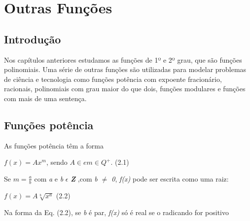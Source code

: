 \chapter{Outras Funções}
\section{Introdução}

\begin{justify}
\quad Nos capítulos anteriores estudamos as funções de 1º e 2º grau, que são funções polinomiais. Uma série de outras funções são utilizadas para modelar problemas de ciência e tecnologia como funções potência com expoente fracionário, racionais, polinomiais com grau maior do que dois, funções modulares e funções com mais de uma sentença.
\end{justify}

\section{Funções potência}

\begin{caixa}
\begin{tdefinicao}
As funções potência têm a forma 

\quad  \( f \left( x \right) =Ax^{m} \), sendo \(A \in e m \in Q^{+}.\) \quad \quad \quad \quad (2.1)

Se  \( m=\frac{a}{b} \)  com \textit{a} e \textit{b} $ \epsilon $  \textbf{\textit{Z}} ,com \textit{b $ \neq $  0}, \textit{f(x)} pode ser escrita como uma raiz:

\quad  \( f \left( x \right) =A\sqrt[b]{x^{a}} \) \quad \quad \quad \quad \quad \quad \quad \quad (2.2)

\quad Na forma da Eq. (2.2), se \textit{b} é par, \textit{f(x)} só é real se o radicando for positivo \qedsymbol{} 
\end{tdefinicao}
\end{caixa}

